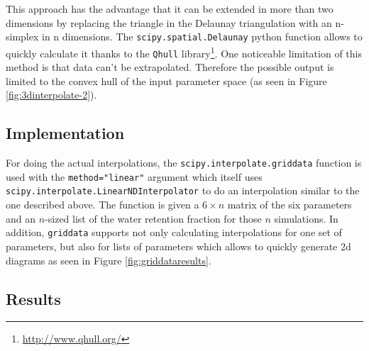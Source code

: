 \begin{figure}[h]
\end{figure}



This approach has the advantage that it can be extended in more than two dimensions by replacing the triangle in the Delaunay triangulation with an n-simplex in n dimensions. The \texttt{scipy.spatial.Delaunay} python function allows to quickly calculate it thanks to the \texttt{Qhull} library\footnote{\url{http://www.qhull.org/}}. One noticeable limitation of this method is that data can't be extrapolated. Therefore the possible output is limited to the convex hull of the input parameter space (as seen in Figure \ref{fig:3dinterpolate-2}).

\subsection{Implementation}
\label{sec:griddata-implementation}
For doing the actual interpolations, the \texttt{scipy.interpolate.griddata} function is used with the \texttt{method="linear"} argument which itself uses \texttt{scipy.interpolate.LinearNDInterpolator} to do an interpolation similar to the one described above. The function is given a $6\times n$ matrix of the six parameters and an $n$-sized list of the water retention fraction for those $n$ simulations. In addition, \texttt{griddata} supports not only calculating interpolations for one set of parameters, but also for lists of parameters which allows to quickly generate 2d diagrams as seen in  Figure \ref{fig:griddataresults}.

\subsection{Results}

